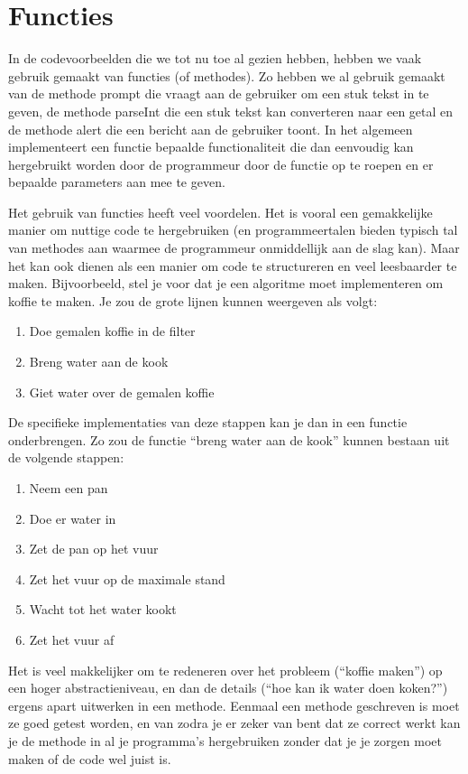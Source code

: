 \chapter{Functies}

In de codevoorbeelden die we tot nu toe al gezien hebben, hebben we vaak gebruik gemaakt van functies (of methodes). Zo hebben we al gebruik gemaakt van de methode prompt die vraagt aan de gebruiker om een stuk tekst in te geven, de methode parseInt die een stuk tekst kan converteren naar een getal en de methode alert die een bericht aan de gebruiker toont. In het algemeen implementeert een functie bepaalde functionaliteit die dan eenvoudig kan hergebruikt worden door de programmeur door de functie op te roepen en er bepaalde parameters aan mee te geven.

Het gebruik van functies heeft veel voordelen. Het is vooral een gemakkelijke manier om nuttige code te hergebruiken (en programmeertalen bieden typisch tal van methodes aan waarmee de programmeur onmiddellijk aan de slag kan). Maar het kan ook dienen als een manier om code te structureren en veel leesbaarder te maken. Bijvoorbeeld, stel je voor dat je een algoritme moet implementeren om koffie te maken. Je zou de grote lijnen kunnen weergeven als volgt:

\begin{enumerate}
\item Doe gemalen koffie in de filter
\item Breng water aan de kook
\item Giet water over de gemalen koffie
\end{enumerate}

De specifieke implementaties van deze stappen kan je dan in een functie onderbrengen. Zo zou de functie ``breng water aan de kook'' kunnen bestaan uit de volgende stappen:

\begin{enumerate}
\item Neem een pan
\item Doe er water in
\item Zet de pan op het vuur
\item Zet het vuur op de maximale stand
\item Wacht tot het water kookt
\item Zet het vuur af
\end{enumerate}

Het is veel makkelijker om te redeneren over het probleem (``koffie maken'') op een hoger abstractieniveau, en dan de details (``hoe kan ik water doen koken?'') ergens apart uitwerken in een methode. Eenmaal een methode geschreven is moet ze goed getest worden, en van zodra je er zeker van bent dat ze correct werkt kan je de methode in al je programma's hergebruiken zonder dat je je zorgen moet maken of de code wel juist is.

